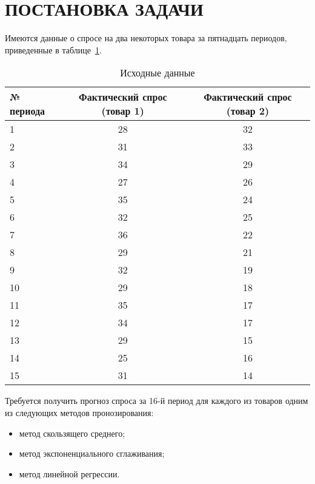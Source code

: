\section{ПОСТАНОВКА ЗАДАЧИ}

Имеются данные о спросе на два некоторых товара за пятнадцать периодов,
приведенные в таблице~\ref{tbl:source_data}.

\begin{table} [h!]
  \caption{
    Исходные данные
  }\label{tbl:source_data}
    \begin{tabular}{| m{2.5cm} | c | c |}
      \hline
      № периода & Фактический спрос (товар 1) & Фактический спрос (товар 2) \\ \hline

      1 & 28 & 32 \\ \hline
      2 & 31 & 33 \\ \hline
      3 & 34 & 29 \\ \hline
      4 & 27 & 26 \\ \hline
      5 & 35 & 24 \\ \hline
      
      6 & 32  & 25 \\ \hline
      7 & 36  & 22 \\ \hline
      8 & 29  & 21 \\ \hline
      9 & 32  & 19 \\ \hline
      10 & 29 & 18 \\ \hline
      
      11 & 35 & 17 \\ \hline
      12 & 34 & 17 \\ \hline
      13 & 29 & 15 \\ \hline
      14 & 25 & 16 \\ \hline
      15 & 31 & 14 \\ \hline
    \end{tabular}
\end{table}

Требуется получить прогноз спроса за 16-й период для каждого из товаров
одним из следующих методов пронозирования:
\begin{itemize}
  \item метод скользящего среднего;
  \item метод экспоненциального сглаживания;
  \item метод линейной регрессии.
\end{itemize}